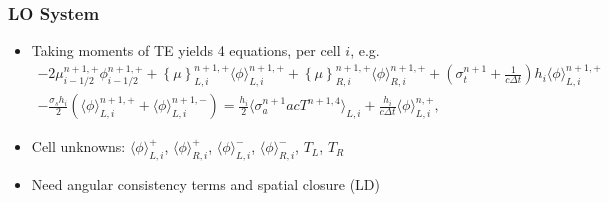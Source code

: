 \documentclass[xcolor=dvipsnames,hyperref={pdfpagelabels=false},handout,unknownkeysallowed]{beamer}
\newcommand{\colb}[1]{{\color{blue} #1}}
\newlength{\wideitemsep}
\let\olditem\item
\renewcommand{\item}{\setlength{\itemsep}{\wideitemsep}\olditem}
\newcommand{\mom}[1]{\langle #1 \rangle}
\newcommand{\cur}[1]{\left\{ #1 \right\}}
\begin{document}
\begin{frame}
    \frametitle{LO System}
    \begin{itemize}
        \item Taking moments of TE yields \colb{4 equations}, per cell $i$, e.g.
\begin{multline}\label{lo_tran}
    -2{\mu}_{i-1/2}^{n+1,+} \phi_{i-1/2}^{n+1,+} + \cur {\mu}_{L,i}^{n+1,+}
  \mom{\phi}_{L,i}^{n+1,+}
  +  \cur\mu_{R,i}^{n+1,+}
  \mom{\phi}_{R,i}^{n+1,+} +  \left(\sigma_t^{n+1}+\frac{1}{c \Delta t} \right) h_i 
  \mom{\phi}_{L,i}^{n+1,+} \\-  \frac{\sigma_s h_i}{2} \left( \mom{\phi}_{L,i}^{n+1,+} +
  \mom\phi_{L,i}^{n+1,-}\right) = \frac{h_i}{2} \mom{\sigma_a^{n+1} a c T^{n+1,4}}_{L,i} +
  \frac{h_i}{c\Delta t}\mom{\phi}_{L,i}^{n,+},
\end{multline}
        \item Cell unknowns: $\mom{\phi}_{L,i}^{+}$, $\mom{\phi}_{R,i}^{+}$,
        $\mom{\phi}_{L,i}^{-}$, $\mom{\phi}_{R,i}^{-}$, $T_L$, $T_R$

    \item Need \colb{angular} consistency terms  and spatial closure
        (LD)
    \end{itemize}

\end{frame}
\end{document}
